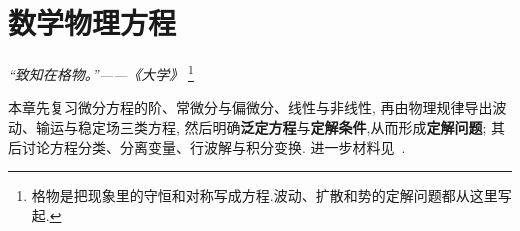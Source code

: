\chapter{数学物理方程}

\begin{flushright}
\textit{“致知在格物。”——《大学》}
\footnote{格物是把现象里的守恒和对称写成方程.波动、扩散和势的定解问题都从这里写起.}
\end{flushright}

本章先复习微分方程的阶、常微分与偏微分、线性与非线性,
再由物理规律导出波动、输运与稳定场三类方程,
然后明确\textbf{泛定方程}与\textbf{定解条件},从而形成\textbf{定解问题};
其后讨论方程分类、分离变量、行波解与积分变换.
进一步材料见~\cite{strauss,tikhonov,courant,guqiao,ivrii}.











